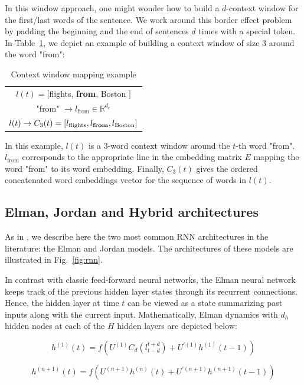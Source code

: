 In this window approach, one might wonder how to build a $d$-context window for
the first/last words of the sentence. We work around this border effect problem
by padding the beginning and the end of sentences $d$ times with a special token.
In Table~\ref{fig:cwmap}, we depict an example of building a context window of size $3$ around the
word "from":

\begin{table}
\centering
\begin{tabular}{c}
$l(t)=[$flights, {\bf from}, Boston $]$ \\
"from" $\rightarrow l_{\textrm{from}}\in\mathbb{R}^{d_e}$ \\
$l(t)\rightarrow C_{3}(t)=[l_{\textrm{flights}}, l_{\textrm{{\bf from}}}, l_{\textrm{Boston}}]$
\end{tabular}
\caption[Context Window Mapping]{
\label{fig:cwmap}
Context window mapping example}
\end{table}

In this example, $l(t)$ is a $3$-word context window around the $t$-th word
"from".  $l_{\textrm{from}}$ corresponds to the appropriate line in the
embedding matrix $E$ mapping the word "from" to its word embedding. Finally,
$C_3 (t)$ gives the ordered concatenated word embeddings vector for the
sequence of words in $l(t)$.

\subsection{Elman, Jordan and Hybrid architectures}

As in \citep{rnn15}, we describe here the two most common RNN architectures in the
literature: the Elman \citep{rnn16} and Jordan \citep{rnn17} models. The architectures of these
models are illustrated in Fig.~\ref{fig:rnn}.

In contrast with classic feed-forward neural networks, the Elman neural network
keeps track of the previous hidden layer states through its recurrent
connections. Hence, the hidden layer at time $t$ can be viewed as a state
summarizing past inputs along with the current input. Mathematically, Elman
dynamics with $d_h$ hidden nodes at each of the $H$ hidden layers are depicted
below:

\begin{equation}
h^{(1)}(t) = f(U^{(1)}C_{d}(l_{t-d}^{t+d})+U^{'(1)}h^{(1)}(t-1))
\end{equation}

\begin{equation}
h^{(n+1)}(t) = f(U^{(n+1)}h^{(n)}(t) + U^{'(n+1)}h^{(n+1)}(t-1))
\end{equation}


